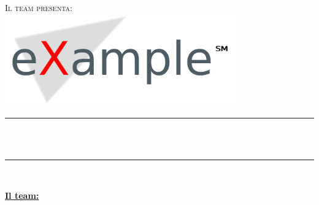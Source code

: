 \makeatletter
\let\thetitle\@title
\let\theauthor\@author
\let\thedate\@date
\makeatother

\begin{titlepage}
		\centering
		
		\vspace*{0.5 cm}
		\textsc{\large \tipoDocumento}\\[0.5 cm]
		\textsc{\Large Il team \theteam{} presenta:}\\[1 cm]
		\includegraphics[height=4cm]{LogoStrumentalMente}\\[0.5 cm]
		
		\rule{\linewidth}{0.2 mm}\\[0.4 cm]
		{ \huge \bfseries \textsc{\ProjectTitle}}\\
		\rule{\linewidth}{0.2 mm}\\[1.5 cm]
		
		\vfill
		
		\begin{minipage}{0.4\textwidth}
			\begin{center} \large %
				\textbf{\underline{Il team:}}\\
				\theauthor
			\end{center}
		\end{minipage}~
\\[2 cm]
		{\large \thedate}\\[2 cm]
		

\end{titlepage}
